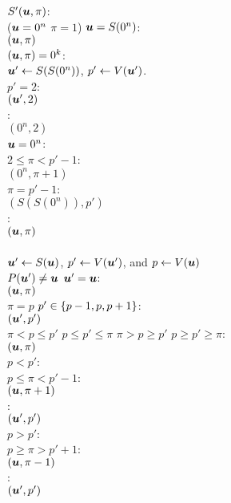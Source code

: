 \begin{algo}
  \underline{$S'(\mbox{\boldmath $u$},\pi)$}:\+
  \\\IfB ($\mbox{\boldmath $u$}=0^n$ \AndB $\pi=1$) \OrB $\mbox{\boldmath $u$}=S(0^n)$:\+
  \\  \ReturnB $(\mbox{\boldmath $u$},\pi)$\-
  \\\IfB $(\mbox{\boldmath $u$},\pi)=0^k$:\+
  \\  $\mbox{\boldmath $u$}'\gets S(S(0^n))$, $p'\gets V(\mbox{\boldmath $u$}')$. 
  \\  \IfB $p'=2$:\+
  \\    \ReturnB $(\mbox{\boldmath $u$}',2)$\-
  \\   \ElseB:\+
  \\     \ReturnB $(0^n,2)$\-\-
  \\\IfB $\mbox{\boldmath $u$}=0^n$:\+
  \\  \IfB $2\le \pi<p'-1$:\+
  \\    \ReturnB $(0^n,\pi+1)$\-
  \\  \ElseIfB $\pi=p'-1$:\+
  \\    \ReturnB $(S(S(0^n)),p')$\-
  \\  \ElseB:\quad{}\+
  \\    \ReturnB $(\mbox{\boldmath $u$},\pi)$\-\-
  \\
  \\$\mbox{\boldmath $u$}'\gets S(\mbox{\boldmath $u$})$, $p'\gets V(\mbox{\boldmath $u$}')$, and $p\gets V(\mbox{\boldmath $u$})$
  \\\IfB $P(\mbox{\boldmath $u$}')\neq \mbox{\boldmath $u$}$ \OrB $\mbox{\boldmath $u$}'=\mbox{\boldmath $u$}$: \+
  \\  \ReturnB $(\mbox{\boldmath $u$},\pi)$\-
  \\\IfB $\pi=p$ \AndB $p' \in \left\{ p-1,p,p+1 \right\}$:\+
  \\  \ReturnB $(\mbox{\boldmath $u$}',p')$\-
  \\\IfB $\pi<p\le p'$ \OrB $p\le p'\le \pi$ \OrB $\pi>p\ge p'$ \OrB $p\ge p'\ge \pi$:\+
  \\  \ReturnB $(\mbox{\boldmath $u$},\pi)$\-
  \\\ElseIfB $p<p'$:\+
  \\  \IfB $p\le \pi<p'-1$:\+
  \\    \ReturnB $(\mbox{\boldmath $u$},\pi+1)$\-
  \\  \ElseB:\quad{}\+
  \\    \ReturnB $(\mbox{\boldmath $u$}',p')$\-\-
  \\\ElseIfB $p>p'$:\+
  \\  \IfB $p \ge \pi>p'+1$:\+
  \\    \ReturnB $(\mbox{\boldmath $u$},\pi-1)$\-
  \\  \ElseB:\quad{}\+
  \\    \ReturnB $(\mbox{\boldmath $u$}',p')$\-\-
\end{algo}

